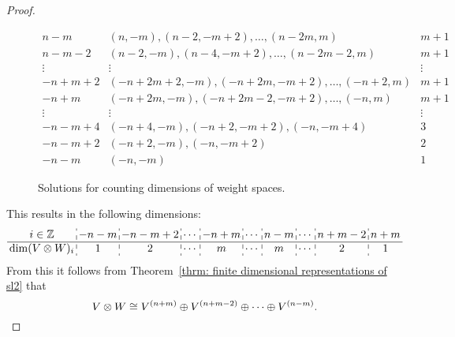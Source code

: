 \begin{proof}
\begin{figure}
\[\begin{array}{c|c|c}
  n-m    & (n, -m), (n-2, -m+2), \dotsc,  (n-2m, m)      & m+1    \\
  n-m-2  & (n-2, -m), (n-4, -m+2), \dotsc, (n-2m-2, m)   & m+1    \\
  \vdots & \vdots                                        & \vdots \\
  -n+m+2 & (-n+2m+2,-m), (-n+2m, -m+2), \dotsc, (-n+2,m) & m+1    \\
  -n+m   & (-n+2m,-m), (-n+2m-2, -m+2), \dotsc, (-n,m)   & m+1    \\
  \vdots & \vdots                                        & \vdots \\
  -n-m+4 & (-n+4,-m), (-n+2,-m+2), (-n,-m+4)             & 3      \\
  -n-m+2 & (-n+2,-m), (-n,-m+2)                          & 2      \\
  -n-m   & (-n,-m)                                       & 1
  \end{array}
 \]
 \caption{Solutions for counting dimensions of weight spaces.}
 \label{fig: solutions for counting dimensions}
 \end{figure}
 This results in the following dimensions:
 \[
  \setlength\arraycolsep{2pt}
  \begin{array}{c:c:c:c:c:c:c:c:c:c}
   i \in \Z            & -n-m & -n-m+2 & \cdots & -n+m & \cdots & n-m & \cdots & n+m-2 & n+m \\
   \hline
   \dim(V \otimes W)_i & 1    & 2      & \cdots & m    & \cdots & m   & \cdots & 2     & 1
  \end{array}
 \]
 From this it follows from Theorem~\ref{thrm: finite dimensional representations of sl2} that
 \[
  V \otimes W \cong V^{(n+m)} \oplus V^{(n+m-2)} \oplus \dotsb \oplus V^{(n-m)}.
  \qedhere
 \]
\end{proof}






















